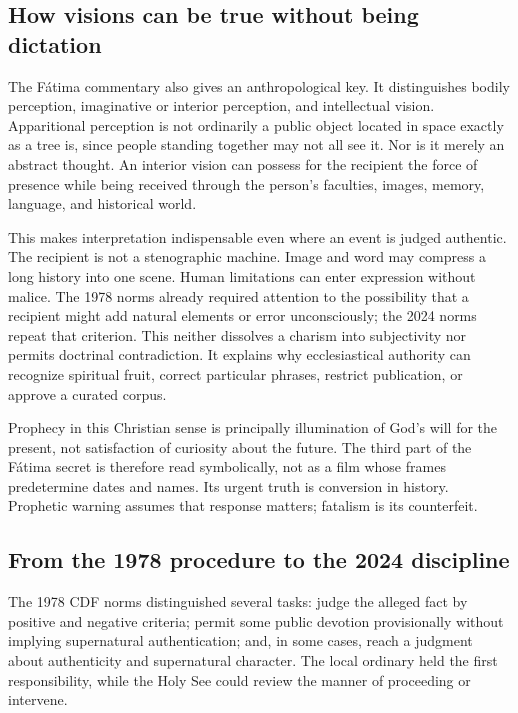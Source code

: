 \subsection{How visions can be true without being dictation}

The Fátima commentary also gives an anthropological key. It distinguishes bodily perception, imaginative or interior perception, and intellectual vision. Apparitional perception is not ordinarily a public object located in space exactly as a tree is, since people standing together may not all see it. Nor is it merely an abstract thought. An interior vision can possess for the recipient the force of presence while being received through the person's faculties, images, memory, language, and historical world.

This makes interpretation indispensable even where an event is judged authentic. The recipient is not a stenographic machine. Image and word may compress a long history into one scene. Human limitations can enter expression without malice. The 1978 norms already required attention to the possibility that a recipient might add natural elements or error unconsciously; the 2024 norms repeat that criterion. This neither dissolves a charism into subjectivity nor permits doctrinal contradiction. It explains why ecclesiastical authority can recognize spiritual fruit, correct particular phrases, restrict publication, or approve a curated corpus.

Prophecy in this Christian sense is principally illumination of God's will for the present, not satisfaction of curiosity about the future. The third part of the Fátima secret is therefore read symbolically, not as a film whose frames predetermine dates and names. Its urgent truth is conversion in history. Prophetic warning assumes that response matters; fatalism is its counterfeit.

\subsection{From the 1978 procedure to the 2024 discipline}

The 1978 CDF norms distinguished several tasks: judge the alleged fact by positive and negative criteria; permit some public devotion provisionally without implying supernatural authentication; and, in some cases, reach a judgment about authenticity and supernatural character. The local ordinary held the first responsibility, while the Holy See could review the manner of proceeding or intervene.

